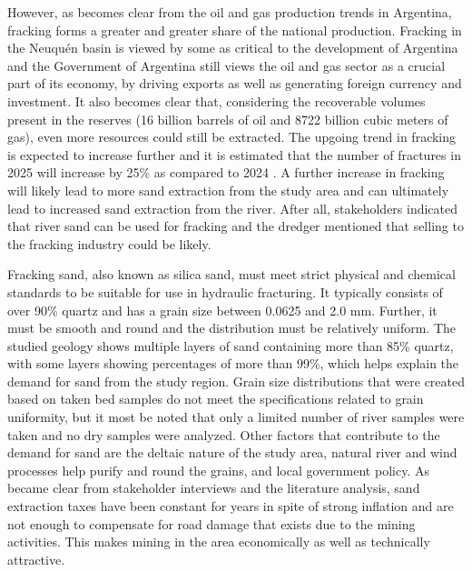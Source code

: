 However, as becomes clear from the oil and gas production trends in Argentina, fracking forms a greater and greater share of the national production. Fracking in the Neuquén basin is viewed by some as critical to the development of Argentina and the Government of Argentina still views the oil and gas sector as a crucial part of its economy, by driving exports as well as generating foreign currency and investment. It also becomes clear that, considering the recoverable volumes present in the reserves (16 billion barrels of oil and 8722 billion cubic meters of gas), even more resources could still be extracted. The upgoing trend in fracking is expected to increase further and it is estimated that the number of fractures in 2025 will increase by 25\% as compared to 2024 \autocite{barnedaFrackingVacaMuerta2025}. A further increase in fracking will likely lead to more sand extraction from the study area and can ultimately lead to increased sand extraction from the river. After all, stakeholders indicated that river sand can be used for fracking and the dredger mentioned that selling to the fracking industry could be likely.

Fracking sand, also known as silica sand, must meet strict physical and chemical standards to be suitable for use in hydraulic fracturing. It typically consists of over 90\% quartz and has a grain size between 0.0625 and 2.0 mm. Further, it must be smooth and round and the distribution must be relatively uniform. The studied geology shows multiple layers of sand containing more than 85\% quartz, with some layers showing percentages of more than 99\%, which helps explain the demand for sand from the study region. Grain size distributions that were created based on taken bed samples do not meet the specifications related to grain uniformity, but it most be noted that only a limited number of river samples were taken and no dry samples were analyzed. Other factors that contribute to the demand for sand are the deltaic nature of the study area, natural river and wind processes help purify and round the grains, and local government policy. As became clear from stakeholder interviews and the literature analysis, sand extraction taxes have been constant for years in spite of strong inflation and are not enough to compensate for road damage that exists due to the mining activities. This makes mining in the area economically as well as technically attractive.

